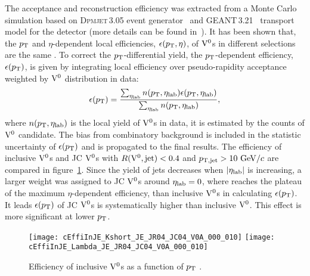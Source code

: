 The acceptance and reconstruction efficiency was extracted from a Monte Carlo simulation based on \textsc{Dpmjet}\,3.05 event generator~\cite{Roesler:2000he} and GEANT\,3.21~\cite{Brun:1994aa} transport model for the detector (more details can be found in~\cite{Aamodt:2011zza}).
It has been shown that, the $\pT$ and $\eta$-dependent local efficiencies, $\epsilon(\pT,\eta)$, of ${\rm V}^{0}$s in different selections are the same .
To correct the $\pT$-differential yield, the $\pT$-dependent efficiency, $\epsilon(\pT)$, is given by integrating local efficiency over pseudo-rapidity acceptance weighted by ${\rm V}^{0}$ distribution in data:
\begin{equation}\label{eq:c05EffiV0}
\epsilon(\pT)=\frac{\sum_{\hlab}n(\pT,\hlab)\epsilon(\pT,\hlab)}{\sum_{\hlab}n(\pT,\hlab)},
\end{equation}
where $n(\pT,\hlab)$ is the local yield of ${\rm V}^{0}$s in data, it is estimated by the counts of ${\rm V}^{0}$ candidate.
The bias from combinatory background is included in the statistic uncertainty of $\epsilon(\pT)$ and is propagated to the final results.
The efficiency of inclusive ${\rm V}^{0}$s and JC ${\rm V}^{0}$s with $R({\rm V}^{0},{\rm jet})<0.4$ and $\pT[jet]>10~\GeVc$ are compared in figure~\ref{fig:c05EffiV0InJets}.
Since the yield of jets decreases when $\left|\eta_{\rm lab}\right|$ is increasing, a larger weight was assigned to JC ${\rm V}^{0}$s around $\eta_{\rm lab}=0$, where reaches the plateau of the maximum $\eta$-dependent efficiency, than inclusive ${\rm V}^{0}$s in calculating $\epsilon(\pT)$.
It leads $\epsilon(\pT)$ of JC ${\rm V}^{0}$s is systematically higher than inclusive ${\rm V}^{0}$.
This effect is more significant at lower $\pT$.

\begin{figure}[t]
\begin{center}
\texttt{[image: cEffiInJE\_Kshort\_JE\_JR04\_JC04\_V0A\_000\_010]}
\texttt{[image: cEffiInJE\_Lambda\_JE\_JR04\_JC04\_V0A\_000\_010]}
\caption{Efficiency of inclusive ${\rm V}^{0}$s as a function of $\pT$ .}
\label{fig:c05EffiV0InJets}
\end{center}
\end{figure}

